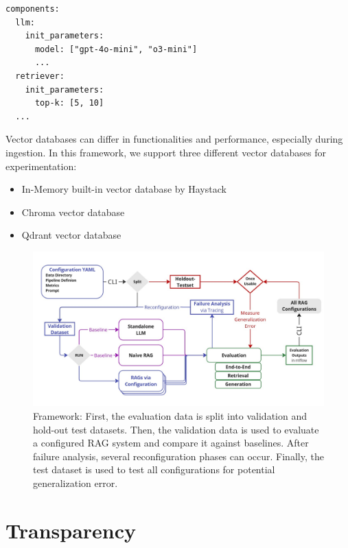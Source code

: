 \begin{verbatim}
components:
  llm:
    init_parameters:
      model: ["gpt-4o-mini", "o3-mini"]
      ...
  retriever:
    init_parameters:
      top-k: [5, 10]
  ...
\end{verbatim}


Vector databases can differ in functionalities and performance, especially during ingestion. In this framework, we support three different vector databases for experimentation:
\begin{itemize}
  \item In-Memory built-in vector database by Haystack
  \item Chroma vector database \cite{Chroma}
  \item Qdrant vector database \cite{qdrant}
\end{itemize}


\begin{figure}[!ht]
  \centering
  \includegraphics[width=\textwidth]{images/FrameworkFull.pdf}
  \caption{Framework: First, the evaluation data is split into validation and hold-out test datasets. Then, the validation data is used to evaluate a configured RAG system and compare it against baselines. After failure analysis, several reconfiguration phases can occur. Finally, the test dataset is used to test all configurations for potential generalization error.}
  \label{fig:framework-full}
\end{figure}


\section{Transparency}

